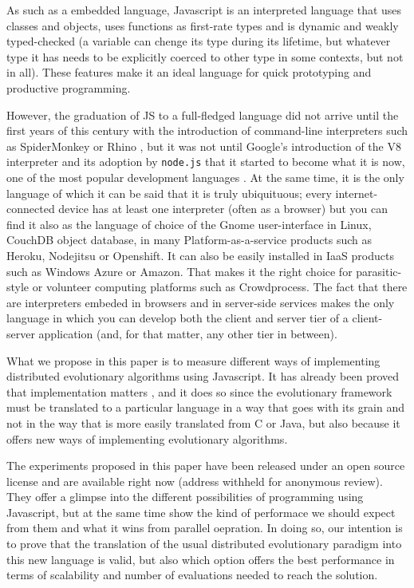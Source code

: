 \documentclass{sig-alternate}
\begin{document}
As such as a embedded language, Javascript is an interpreted language
that uses classes and objects, uses functions as first-rate types and
is dynamic and weakly typed-checked (a variable can chenge its type during
its lifetime, but whatever type it has needs to be explicitly coerced
to other type in some contexts, but not in all). These features make
it an ideal language for quick prototyping and productive
programming. 

However, the graduation of JS to a full-fledged language did not arrive until the first years of
this century with the introduction of command-line interpreters such
as SpiderMonkey or Rhino \cite{mikkonen2007using}, but it was not
until Google's introduction of the V8 \cite{richards2010analysis}
interpreter and its adoption by  {\tt node.js} that it started to
become what it is now, one of the most popular development languages
\cite{ogrady14:ranking}. At the same time, it is the only language of
which it can be said that it is truly ubiquituous; every
internet-connected device has at least one interpreter
\cite{crockford:javascript} (often as a browser) but you can find it
also as the language of choice of the Gnome user-interface in Linux,
CouchDB object database, in many Platform-as-a-service products such
as Heroku, Nodejitsu or Openshift. It can also be easily installed in
IaaS products such as Windows Azure or Amazon. That makes it the right
choice for parasitic-style or volunteer computing platforms such as
Crowdprocess. The fact that there are interpreters embeded in browsers
and in server-side services makes the only language in which you can
develop both the client and server tier of a client-server application
(and, for that matter, any other tier in between).

What we propose in this paper is to measure different ways of
implementing distributed evolutionary algorithms using Javascript. It
has already been proved that implementation matters
\cite{DBLP:conf/iwann/MereloRACML11}, and it does so since the
evolutionary framework must be translated to a particular language in
a way that goes with its grain and not in the way that is more easily
translated from C or Java, but also because it offers new ways of
implementing evolutionary algorithms.

The experiments proposed in this paper have been released under an
open source license and are available right now (address withheld for
anonymous review). They offer a glimpse into the different
possibilities of programming using Javascript, but at the same time
show the kind of performace we should expect from them and what it
wins from parallel oepration. In doing so, our intention is to prove
that the translation of the usual distributed evolutionary paradigm
into this new language is valid, but also which option offers the best
performance in terms of scalability and number of evaluations needed
to reach the solution.
\end{document}
